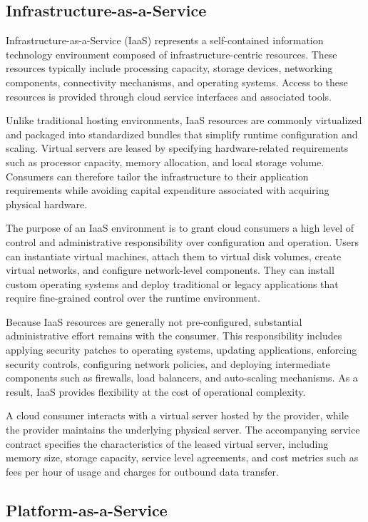 \documentclass[11pt,a4paper,openany]{report}
\begin{document}
\subsection{Infrastructure-as-a-Service}

Infrastructure-as-a-Service (IaaS) represents a self-contained information technology environment composed of infrastructure-centric resources. These resources typically include processing capacity, storage devices, networking components, connectivity mechanisms, and operating systems. Access to these resources is provided through cloud service interfaces and associated tools.

Unlike traditional hosting environments, IaaS resources are commonly virtualized and packaged into standardized bundles that simplify runtime configuration and scaling. Virtual servers are leased by specifying hardware-related requirements such as processor capacity, memory allocation, and local storage volume. Consumers can therefore tailor the infrastructure to their application requirements while avoiding capital expenditure associated with acquiring physical hardware.

The purpose of an IaaS environment is to grant cloud consumers a high level of control and administrative responsibility over configuration and operation. Users can instantiate virtual machines, attach them to virtual disk volumes, create virtual networks, and configure network-level components. They can install custom operating systems and deploy traditional or legacy applications that require fine-grained control over the runtime environment.

Because IaaS resources are generally not pre-configured, substantial administrative effort remains with the consumer. This responsibility includes applying security patches to operating systems, updating applications, enforcing security controls, configuring network policies, and deploying intermediate components such as firewalls, load balancers, and auto-scaling mechanisms. As a result, IaaS provides flexibility at the cost of operational complexity.

A cloud consumer interacts with a virtual server hosted by the provider, while the provider maintains the underlying physical server. The accompanying service contract specifies the characteristics of the leased virtual server, including memory size, storage capacity, service level agreements, and cost metrics such as fees per hour of usage and charges for outbound data transfer.

\subsection{Platform-as-a-Service}
\end{document}
